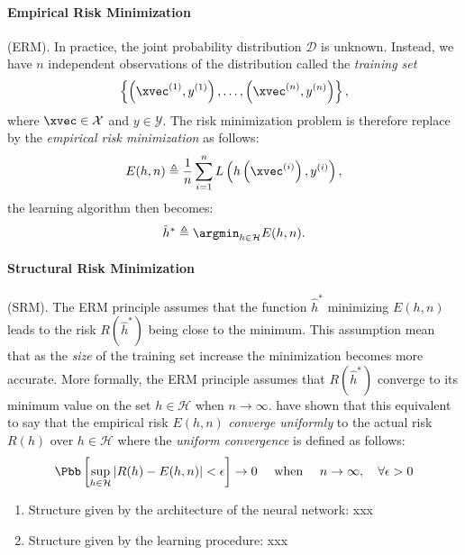 \paragraph{Empirical Risk Minimization} (ERM).
In practice, the joint probability distribution $\mathcal{D}$ is unknown.
Instead, we have $n$ independent observations of the distribution called the \emph{training set}
\begin{equation}
  \left\{ \left(\xvec^{(1)}, y^{(1)} \right), \dots, \left( \xvec^{(n)}, y^{(n)} \right) \right\} ,
\end{equation}
where $\xvec \in \mathcal{X}$ and $y \in \mathcal{Y}$.
The risk minimization problem is therefore replace by the \emph{empirical risk minimization} as follows:
\begin{equation}
  E(h, n) \triangleq \frac{1}{n} \sum_{i = 1}^{n} L\left(h\left(\xvec^{(i)}\right), y^{(i)}\right) ,
\end{equation}
the learning algorithm then becomes:
\begin{equation}
  \hat{h}^* \triangleq \argmin_{h \in \mathcal{H}} E(h, n)  .
\end{equation}


\paragraph{Structural Risk Minimization} (SRM).
The ERM principle assumes that the function $\hat{h}^*$ minimizing $E(h, n)$ leads to the risk $R(\hat{h}^*)$ being close to the minimum.
This assumption mean that as the \emph{size} of the training set increase the minimization becomes more accurate. More formally, the ERM principle assumes that $R(\hat{h}^*)$ converge to its minimum value on the set $h \in \mathcal{H}$ when $n \rightarrow \infty$.  
\citet{Vapnik1991TheNA} have shown that this equivalent to say that the empirical risk $E(h, n)$ \emph{converge uniformly} to the actual risk $R(h)$ over $h \in \mathcal{H}$ where the \emph{uniform convergence} is defined as follows:
\begin{equation}
  \Pbb \left[ \sup_{h \in \mathcal{H}} \left| R(h) - E(h, n) \right| < \epsilon \right] \rightarrow 0 \quad \text{ when } \quad n \rightarrow \infty, \quad \forall \epsilon > 0 
\end{equation}


\begin{enumerate}
  \item Structure given by the architecture of the neural network: xxx
  \item Structure given by the learning procedure: xxx 
\end{enumerate}



